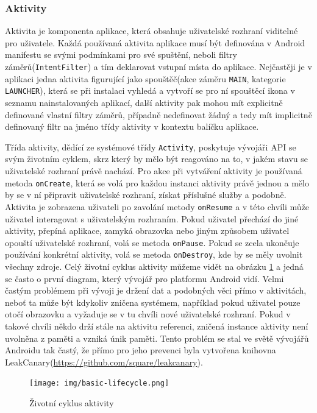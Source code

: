 \documentclass[czech,master,public,dept460,male,java,cpdeclaration]{diploma}
\begin{document}
\subsubsection{Aktivity}
Aktivita je komponenta aplikace, která obsahuje uživatelské rozhraní viditelné pro uživatele. Každá
 používaná aktivita aplikace musí být definována v Android manifestu se svými podmínkami pro své
 spuštění, neboli filtry záměrů(\texttt{IntentFilter}) a tím deklarovat vstupní místa do aplikace.
 Nejčastěji je v aplikaci jedna aktivita figurující jako spouštěč(akce záměru \texttt{MAIN},
 kategorie \texttt{LAUNCHER}), která se při
  instalaci vyhledá a vytvoří se pro ní spouštěcí ikona v seznamu nainstalovaných aplikací, další
  aktivity pak mohou mít explicitně definované vlastní filtry záměrů, případně nedefinovat žádný
  a tedy mít implicitně definovaný filtr na jméno třídy aktivity v kontextu balíčku aplikace.

 Třída aktivity, dědící ze systémové třídy \texttt{Activity},
 poskytuje vývojáři API se svým životním cyklem, skrz který by mělo být reagováno na to, v jakém
stavu se uživatelské rozhraní právě nachází. Pro akce při vytváření aktivity je používaná metoda
\texttt{onCreate}, která se volá pro každou instanci aktivity právě jednou a mělo by se v ní připravit
uživatelské rozhraní, získat příslušné služby a podobně. Aktivita je zobrazena uživateli po zavolání metody
\texttt{onResume} a v této chvíli může uživatel interagovat s uživatelským rozhraním. Pokud uživatel
přechází do jiné aktivity, přepíná aplikace, zamyká obrazovka nebo jiným způsobem uživatel opouští uživatelské
rozhraní, volá se metoda \texttt{onPause}. Pokud se zcela ukončuje používání konkrétní aktivity,
volá se metoda \texttt{onDestroy}, kde by se měly uvolnit všechny zdroje.
Celý životní cyklus aktivity můžeme vidět na obrázku \ref{fig:activitylyfecycle} a jedná se
často o první diagram, který vývojář pro platformu Android vidí.
Velmi častým problémem při vývoji je držení dat a podobných věci přímo v aktivitách,
neboť ta může být kdykoliv zničena systémem, například
pokud uživatel pouze otočí obrazovku a vyžaduje se v tu chvíli nové uživatelské rozhraní. Pokud v takové chvíli
někdo drží stále na aktivitu referenci, zničená instance aktivity není uvolněna z paměti a vzniká únik paměti.
Tento problém se stal ve světě vývojářů Androidu tak častý, že přímo pro jeho prevenci byla vytvořena knihovna
LeakCanary(\url{https://github.com/square/leakcanary}).
\begin{figure}[H]
        \centering
                \texttt{[image: img/basic-lifecycle.png]}
        \caption{Životní cyklus aktivity}
        \label{fig:activitylyfecycle}
\end{figure}
\end{document}
